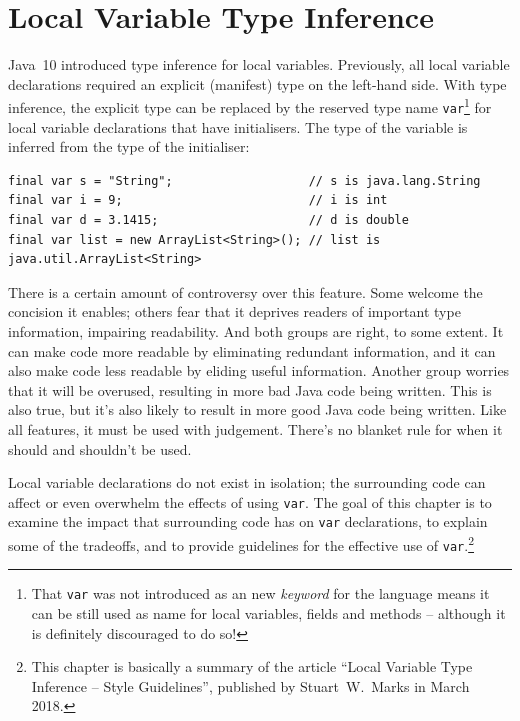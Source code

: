 \documentclass[11pt,a4paper, titlepage, parskip=half, headsepline, footsepline, cleardoublepage=current, headheight=1cm]{scrbook}
\begin{document}

\section{Local Variable Type Inference}\label{sec:LocalVariableTypeInference}
Java~10 introduced type inference for local variables. Previously, all local variable declarations required an explicit (manifest) type on the left-hand side. With type inference, the explicit type can be replaced by the reserved type name \lstinline|var|\footnote{That \lstinline|var| was not introduced as an new \textit{keyword} for the language means it can be still used as name for local variables, fields and methods – although it is definitely discouraged to do so!} for local variable declarations that have initialisers. The type of the variable is inferred from the type of the initialiser:
\begin{lstlisting}
final var s = "String";                   // s is java.lang.String
final var i = 9;                          // i is int
final var d = 3.1415;                     // d is double
final var list = new ArrayList<String>(); // list is java.util.ArrayList<String>
\end{lstlisting}

There is a certain amount of controversy over this feature. Some welcome the concision it enables; others fear that it deprives readers of important type information, impairing readability. And both groups are right, to some extent. It can make code more readable by eliminating redundant information, and it can also make code less readable by eliding useful information. Another group worries that it will be overused, resulting in more bad Java code being written. This is also true, but it’s also likely to result in more good Java code being written. Like all features, it must be used with judgement. There’s no blanket rule for when it should and shouldn’t be used. 

Local variable declarations do not exist in isolation; the surrounding code can affect or even overwhelm the effects of using \lstinline|var|. The goal of this chapter is to examine the impact that surrounding code has on \lstinline|var| declarations, to explain some of the tradeoffs, and to provide guidelines for the effective use of \lstinline|var|.\footnote{This chapter is basically a summary of the article “Local Variable Type Inference – Style Guidelines”, published by Stuart~W.~Marks in March 2018\autocite{Marks:LocalVariableTypeInference}.}
\end{document}
